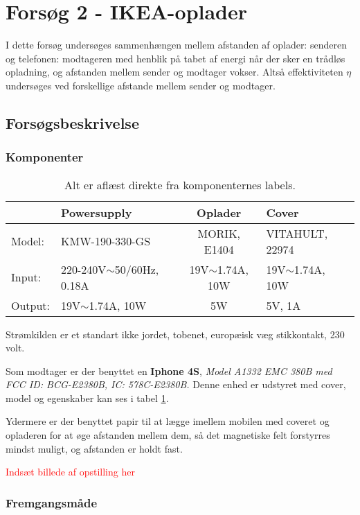 \section{Forsøg 2 - IKEA-oplader}

I dette forsøg undersøges sammenhængen mellem afstanden af oplader: senderen og telefonen: modtageren med henblik på tabet af energi når der sker en trådløs opladning, og afstanden mellem sender og modtager vokser. Altså effektiviteten $\eta$ undersøges ved forskellige afstande mellem sender og modtager.

\subsection{Forsøgsbeskrivelse}
\subsubsection{Komponenter}

\begin{table}[htbp] %
\centering
\label{sender}
\begin{tabular}{l|l|c|l}
        & Powersupply                  & Oplader             & Cover               \\ \hline
Model:  & KMW-190-330-GS               & MORIK, E1404        & VITAHULT, 22974     \\
Input:  & 220-240V$\sim$50/60Hz, 0.18A & 19V$\sim$1.74A, 10W & 19V$\sim$1.74A, 10W \\
Output: & 19V$\sim$1.74A, 10W          & 5W                  & 5V, 1A             
\end{tabular}
\caption{Alt er aflæst direkte fra komponenternes labels.}
\end{table}

Strømkilden er et standart ikke jordet, tobenet, europæisk væg stikkontakt, 230 volt.

Som modtager er der benyttet en \textbf{Iphone 4S}, \textit{Model A1332 EMC 380B med FCC ID: BCG-E2380B, IC: 578C-E2380B.} 
Denne enhed er udstyret med cover, model og egenskaber kan ses i tabel \ref{sender}.

Ydermere er der benyttet papir til at lægge imellem mobilen med coveret og opladeren for at øge afstanden mellem dem, så det magnetiske felt forstyrres mindst muligt, og afstanden er holdt fast. 

\textcolor{red}{Indsæt billede af opstilling her} 

\subsubsection{Fremgangsmåde}

